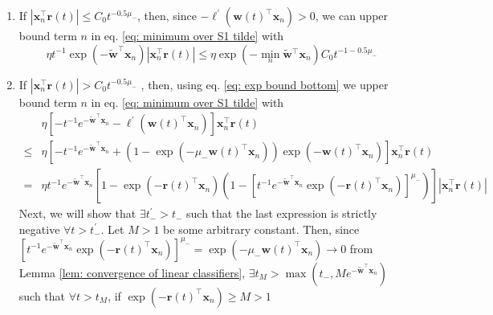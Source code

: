 \documentclass[twoside,11pt,english]{article}
\begin{document}
\begin{enumerate}
\item If $\left|\mathbf{x}_{n}^{\top}\mathbf{r}(t)\right|\leq C_{0}t^{-0.5\mu_{-}}$,
then, since $-\ell^{\prime}\left(\mathbf{w}\left(t\right)^{\top}\mathbf{x}_{n}\right)>0$,
we can upper bound term $n$ in eq. \ref{eq: minimum over S1 tilde}
with 
\begin{equation}
\eta t^{-1}\exp\left(-\tilde{\mathbf{w}}^{\top}\mathbf{x}_{n}\right)\left|\mathbf{x}_{n}^{\top}\mathbf{r}\left(t\right)\right|\leq\eta\exp\left(-\min_{n}\mathbf{\tilde{w}}{}^{\top}\mathbf{x}_{n}\right)C_{0}t^{-1-0.5\mu_{-}}\label{eq: negative case a}
\end{equation}
\item If $\left|\mathbf{x}_{n}^{\top}\mathbf{r}\left(t\right)\right|>C_{0}t^{-0.5\mu_{-}}$
, then, using eq. \ref{eq: exp bound bottom} we upper bound term
$n$ in eq. \ref{eq: minimum over S1 tilde} with 
\begin{align}
 & \eta\left[-t^{-1}e^{-\tilde{\mathbf{w}}^{\top}\mathbf{x}_{n}}-\ell^{\prime}\left(\mathbf{w}\left(t\right)^{\top}\mathbf{x}_{n}\right)\right]\mathbf{x}_{n}^{\top}\mathbf{r}\left(t\right)\nonumber \\
\leq & \eta\left[-t^{-1}e^{-\tilde{\mathbf{w}}^{\top}\mathbf{x}_{n}}+\left(1-\exp\left(-\mu_{-}\mathbf{w}\left(t\right)^{\top}\mathbf{x}_{n}\right)\right)\exp\left(-\mathbf{w}\left(t\right)^{\top}\mathbf{x}_{n}\right)\right]\mathbf{x}_{n}^{\top}\mathbf{r}\left(t\right)\nonumber \\
= & \eta t^{-1}e^{-\tilde{\mathbf{w}}^{\top}\mathbf{x}_{n}}\left[1-\exp\left(-\mathbf{r}\left(t\right)^{\top}\mathbf{x}_{n}\right)\left(1-\left[t^{-1}e^{-\tilde{\mathbf{w}}^{\top}\mathbf{x}_{n}}\exp\left(-\mathbf{r}\left(t\right)^{\top}\mathbf{x}_{n}\right)\right]^{\mu_{-}}\right)\right]\left|\mathbf{x}_{n}^{\top}\mathbf{r}\left(t\right)\right|\label{eq: case 2 2}
\end{align}
Next, we will show that $\exists t_{-}^{\prime}>t_{-}$ such that
the last expression is strictly negative $\forall t>t_{-}^{\prime}$.
Let $M>1$ be some arbitrary constant. Then, since $\left[t^{-1}e^{-\tilde{\mathbf{w}}^{\top}\mathbf{x}_{n}}\exp\left(-\mathbf{r}\left(t\right)^{\top}\mathbf{x}_{n}\right)\right]^{\mu_{-}}=\exp\left(-\mu_{-}\mathbf{w}\left(t\right)^{\top}\mathbf{x}_{n}\right)\rightarrow0$
from Lemma \ref{lem: convergence of linear classifiers}, $\exists t_{M}>\max (t_{-}, Me^{-\tilde{\mathbf{w}}^{\top}\mathbf{x}_{n}})$
such that $\forall t>t_{M}$, if $\exp\left(-\mathbf{r}\left(t\right)^{\top}\mathbf{x}_{n}\right)\geq M>1$

\end{enumerate}
\end{document}
